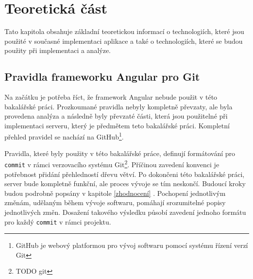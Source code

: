 \chapter{Teoretická část}\label{resere}
Tato kapitola obsahuje základní teoretickou informací o technologiích, které jsou použité v současné implementaci aplikace a také o technologiích, které se budou použity při implementaci a analýze.

\section{Pravidla frameworku Angular pro Git}\label{reserse:git}
    Na začátku je potřeba říct, že framework Angular nebude použit v této bakalářské práci. Prozkoumané pravidla nebyly kompletně převzaty, ale byla provedena analýza a následně byly převzaté části, která jsou použitelné při implementaci serveru, který je předmětem teto bakalářské práci. Kompletní přehled pravidel se nachází na GitHub\footnote{ GitHub je webový platformou pro vývoj softwaru pomocí systému řízení verzí Git}\cite{angular-git}.
    
    Pravidla, které byly použity v této bakalářské práce, definují formátování pro \verb|commit| v rámci verzovacího systému Git\footnote{TODO git}. Příčinou zavedení konvenci je potřebnost přidání přehledností dřevu větví. Po dokončeni této bakalářské práci, server bude kompletně funkční, ale proces vývoje se tím neskončí. Budoucí kroky budou podrobně popsány v kapitole \ref{zhodnocení} . Pochopení jednotlivým změnám, udělaným během vývoje softwaru, pomáhají srozumitelné popisy jednotlivých změn. Dosažení takového výsledku působí zavedení jednoho formátu pro každý \verb|commit| v rámci projektu.
    
